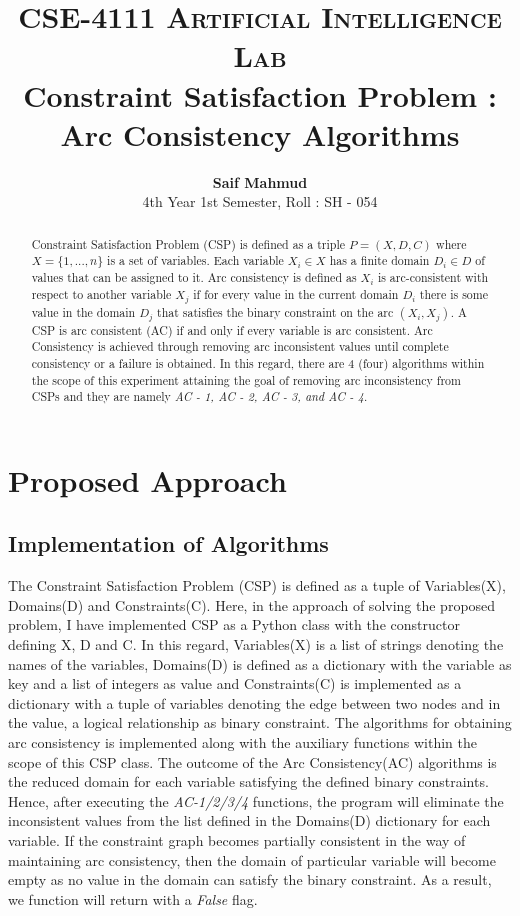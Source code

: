 \documentclass[10pt,twocolumn]{article}
\title{
		\usefont{OT1}{bch}{b}{n}
		\normalfont \normalsize \textsc{CSE-4111 Artificial Intelligence Lab} \\ [10pt]
		\huge Constraint Satisfaction Problem : Arc Consistency Algorithms \\
}
\author[0]{\textbf{Saif Mahmud}\\
		4th Year 1st Semester, Roll : SH - 054\\}
\begin{document}
\maketitle

\begin{abstract}
Constraint Satisfaction Problem (CSP) is defined as a triple $ P = (X, D, C) $ where $ X = \{1,...,n\} $ is a set of variables. Each variable $ X_{i} ∈ X $ has a finite domain $ D_{i} ∈ D $ of values that can be assigned to it. Arc consistency is defined as $ X_{i} $ is arc-consistent with respect to another variable $ X_{j} $ if for every value in the current domain $ D_{i} $ there is some value in the domain $ D_{j} $ that satisfies the binary constraint on the arc $ (X_{i} , X_{j}) $. A CSP is arc consistent (AC) if and only if every variable is arc consistent. Arc Consistency is achieved through removing arc inconsistent values until complete consistency or a failure is obtained. In this regard, there are 4 (four) algorithms within the scope of this experiment attaining the goal of removing arc inconsistency from CSPs and they are namely \textit{AC - 1, AC - 2, AC - 3, and AC - 4}.
\end{abstract}

\section{Proposed Approach}

\subsection{Implementation of Algorithms}
The Constraint Satisfaction Problem (CSP) is defined as a tuple of Variables(X), Domains(D) and Constraints(C). Here, in the approach of solving the proposed problem, I have implemented CSP as a Python class with the constructor defining X, D and C. In this regard, Variables(X) is a list of strings denoting the names of the variables, Domains(D) is defined as a dictionary with the variable as key and a list of integers as value and Constraints(C) is implemented as a dictionary with a tuple of variables denoting the edge between two nodes and in the value, a logical relationship as binary constraint. The algorithms for obtaining arc consistency is implemented along with the auxiliary functions within the scope of this CSP class. The outcome of the Arc Consistency(AC) algorithms is the reduced domain for each variable satisfying the defined binary constraints. Hence, after executing the \textit{AC-1/2/3/4} functions, the program will eliminate the inconsistent values from the list defined in the Domains(D) dictionary for each variable. If the constraint graph becomes partially consistent in the way of maintaining arc consistency, then the domain of particular variable will become empty as no value in the domain can satisfy the binary constraint. As a result, we function will return with a \textit{False} flag.
\end{document}
